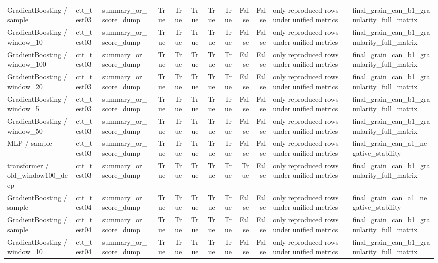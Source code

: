 \begin{tabular}{lllrrrrrrrll}
GradientBoosting / sample & ctt\_test03 & summary\_or\_score\_dump & True & True & True & True & True & False & False & only reproduced rows under unified metrics & final\_grain\_can\_b1\_granularity\_full\_matrix \\
GradientBoosting / window\_10 & ctt\_test03 & summary\_or\_score\_dump & True & True & True & True & True & False & False & only reproduced rows under unified metrics & final\_grain\_can\_b1\_granularity\_full\_matrix \\
GradientBoosting / window\_100 & ctt\_test03 & summary\_or\_score\_dump & True & True & True & True & True & False & False & only reproduced rows under unified metrics & final\_grain\_can\_b1\_granularity\_full\_matrix \\
GradientBoosting / window\_20 & ctt\_test03 & summary\_or\_score\_dump & True & True & True & True & True & False & False & only reproduced rows under unified metrics & final\_grain\_can\_b1\_granularity\_full\_matrix \\
GradientBoosting / window\_5 & ctt\_test03 & summary\_or\_score\_dump & True & True & True & True & True & False & False & only reproduced rows under unified metrics & final\_grain\_can\_b1\_granularity\_full\_matrix \\
GradientBoosting / window\_50 & ctt\_test03 & summary\_or\_score\_dump & True & True & True & True & True & False & False & only reproduced rows under unified metrics & final\_grain\_can\_b1\_granularity\_full\_matrix \\
MLP / sample & ctt\_test03 & summary\_or\_score\_dump & True & True & True & True & True & False & False & only reproduced rows under unified metrics & final\_grain\_can\_a1\_negative\_stability \\
transformer / old\_window100\_deep & ctt\_test03 & summary\_or\_score\_dump & True & True & True & True & True & True & False & only reproduced rows under unified metrics & final\_grain\_can\_b1\_granularity\_full\_matrix \\
GradientBoosting / sample & ctt\_test04 & summary\_or\_score\_dump & True & True & True & True & True & False & False & only reproduced rows under unified metrics & final\_grain\_can\_a1\_negative\_stability \\
GradientBoosting / sample & ctt\_test04 & summary\_or\_score\_dump & True & True & True & True & True & False & False & only reproduced rows under unified metrics & final\_grain\_can\_b1\_granularity\_full\_matrix \\
GradientBoosting / window\_10 & ctt\_test04 & summary\_or\_score\_dump & True & True & True & True & True & False & False & only reproduced rows under unified metrics & final\_grain\_can\_b1\_granularity\_full\_matrix \\

\end{tabular}
